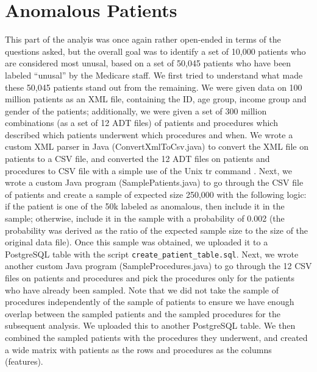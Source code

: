 \section{Anomalous Patients}
\label{sec:anom_patients}
This part of the analyis was once again rather open-ended in terms of the questions asked, but the overall goal was to identify a set of 10,000 patients who are considered most unusal, based on a set of 50,045 patients who have been labeled ``unusal'' by the Medicare staff. We first tried to understand what made these 50,045 patients stand out from the remaining. We were given data on 100 million patients as an XML file, containing the ID, age group, income group and gender of the patients; additionally, we were given a set of 300 million combinations (as a set of 12 ADT files) of patients and procedures which described which patients underwent which procedures and when. We wrote a custom XML parser in Java (ConvertXmlToCsv.java) to convert the XML file on patients to a CSV file, and converted the 12 ADT files on patients and procedures to CSV file with a simple use of the Unix tr command \cite{utr}. Next, we wrote a custom Java program (SamplePatients.java) to go through the CSV file of patients and create a sample of expected size 250,000 with the following logic: if the patient is one of the 50k labeled as anomalous, then include it in the sample; otherwise, include it in the sample with a probability of 0.002 (the probability was derived as the ratio of the expected sample size to the size of the original data file). Once this sample was obtained, we uploaded it to a PostgreSQL table with the script \texttt{create\_patient\_table.sql}. Next, we wrote another custom Java program (SampleProcedures.java) to go through the 12 CSV files on patients and procedures and pick the procedures only for the patients who have already been sampled. Note that we did not take the sample of procedures independently of the sample of patients to ensure we have enough overlap between the sampled patients and the sampled procedures for the subsequent analysis. We uploaded this to another PostgreSQL table. We then combined the sampled patients with the procedures they underwent, and created a wide matrix with patients as the rows and procedures as the columns (features).\\

